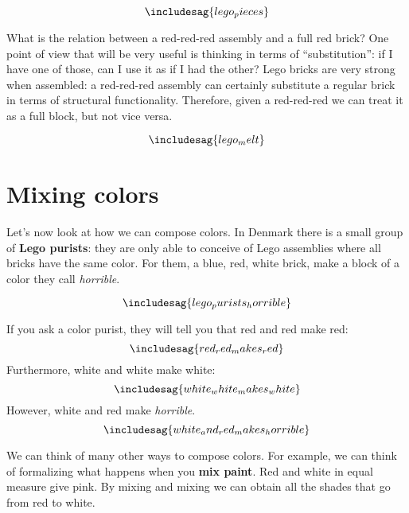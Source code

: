 \begin{equation}
  \includesag{lego_pieces}
\end{equation}

What is the relation between a red-red-red assembly and a full red brick?
One point of view that will be very useful is thinking in terms of ``substitution'': if I have one of those, can I use it as if I had the other?
Lego bricks are very strong when assembled: a red-red-red assembly can certainly substitute
a regular brick in terms of structural functionality.
Therefore, given a red-red-red we can treat it as a full block, but not vice versa.

\begin{equation}
\includesag{lego_melt}
\end{equation}

\section{Mixing colors}

Let's now look at how we can compose colors.
In Denmark there is a small group of \textbf{Lego purists}: they are only able to conceive of Lego assemblies where all bricks have the same color.
For them, a blue, red, white brick, make a block of a color they call \emph{horrible}.

\begin{equation}
\includesag{lego_purists_horrible}
\end{equation}

If you ask a color purist, they will tell you that red and red make red:
%
\begin{equation}
\includesag{red_red_makes_red}
\end{equation}
%
Furthermore, white and white make white:
%
\begin{equation}
\includesag{white_white_makes_white}
\end{equation}
%
However, white and red make \emph{horrible}.
%
\begin{equation}
\includesag{white_and_red_makes_horrible}
\end{equation}



We can think of many other ways to compose colors.
For example, we can think of formalizing what happens when you \textbf{mix paint}.
Red and white in equal measure give pink.
By mixing and mixing we can obtain all the shades that go from red to white.


